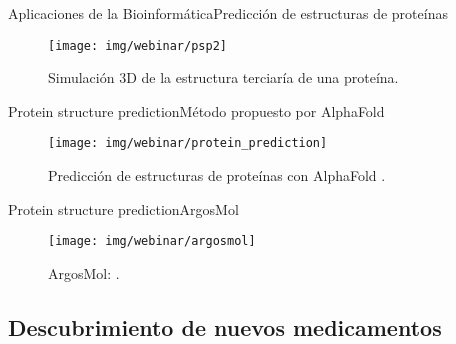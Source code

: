 \documentclass[10pt]{beamer}
\newcommand{\chref}[3][blue]{\href{#2}{\color{#1}{#3}}}%
\newcommand{\chref}[2]{	\href{#1}{{\usebeamercolor[bg]{Feather}#2}} }
\newcommand{\chref}[3][blue]{\href{#2}{\color{#1}{#3}}}%
\newcommand{\1}{
        	\setbeamertemplate{background}{
        		\texttt{[image: img/1]}
        		\tikz[overlay] \fill[fill opacity=0.75,fill=white] (0,0) rectangle (-\paperwidth,\paperheight);
        	}
}
\begin{document}
\begin{frame}{Aplicaciones de la Bioinformática}{Predicción de estructuras de proteínas}
	\begin{figure}[]
		\centering
		\texttt{[image: img/webinar/psp2]}
		\caption{Simulación 3D de la estructura terciaría de una proteína.}
	\end{figure}
\end{frame}

\begin{frame}{Protein structure prediction}{Método propuesto por AlphaFold}
	\begin{figure}[]
		\centering
		\texttt{[image: img/webinar/protein\_prediction]}
		\caption{Predicción de estructuras de proteínas con AlphaFold \cite{alphafold2020}.}
	\end{figure}
\end{frame}

\begin{frame}{Protein structure prediction}{ArgosMol}
	\begin{figure}[]
		\centering
		\texttt{[image: img/webinar/argosmol]}
		\caption{ArgosMol: \chref{http://143.244.188.93:8080/}{http://143.244.188.93:8080}  \cite{condori2022argosmol}.}
	\end{figure}
\end{frame}

\subsection{Descubrimiento de nuevos medicamentos}
\end{document}
